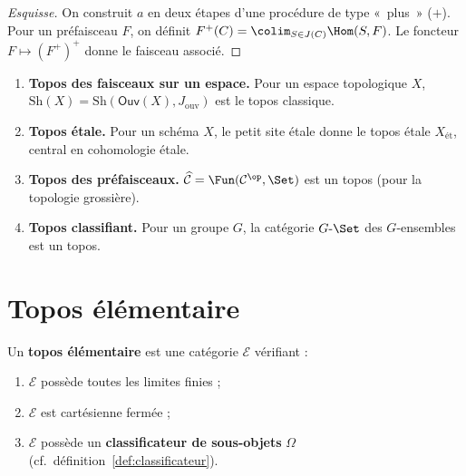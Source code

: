 \begin{proof}[Esquisse]
On construit $a$ en deux étapes d'une procédure de type «~plus~» ($+$).
Pour un préfaisceau $F$, on définit
$F^+(C) = \colim_{S \in J(C)} \Hom(S, F)$.
Le foncteur $F \mapsto (F^+)^+$ donne le faisceau associé.
\end{proof}

\begin{exemple}\label{ex:topos}
\begin{enumerate}[label=(\roman*)]
\item \textbf{Topos des faisceaux sur un espace.}
      Pour un espace topologique $X$,
      $\mathrm{Sh}(X) = \mathrm{Sh}(\mathsf{Ouv}(X), J_{\text{ouv}})$
      est le topos classique.

\item \textbf{Topos étale.}
      Pour un schéma $X$, le petit site étale donne le topos étale
      $X_{\text{ét}}$, central en cohomologie étale.

\item \textbf{Topos des préfaisceaux.}
      $\widehat{\mathcal{C}} = \Fun(\mathcal{C}^\op, \Set)$ est un
      topos (pour la topologie grossière).

\item \textbf{Topos classifiant.}
      Pour un groupe $G$, la catégorie $G\text{-}\Set$ des $G$-ensembles
      est un topos.
\end{enumerate}
\end{exemple}

\section{Topos élémentaire}\label{sec:topos-elementaire}

\begin{definition}\label{def:topos-elementaire}
Un \textbf{topos élémentaire} est une catégorie $\mathcal{E}$ vérifiant :
\begin{enumerate}[label=(\roman*)]
\item $\mathcal{E}$ possède toutes les limites finies ;
\item $\mathcal{E}$ est cartésienne fermée ;
\item $\mathcal{E}$ possède un \textbf{classificateur de sous-objets}
      $\Omega$ (cf.\ définition~\ref{def:classificateur}).
\end{enumerate}
\end{definition}

